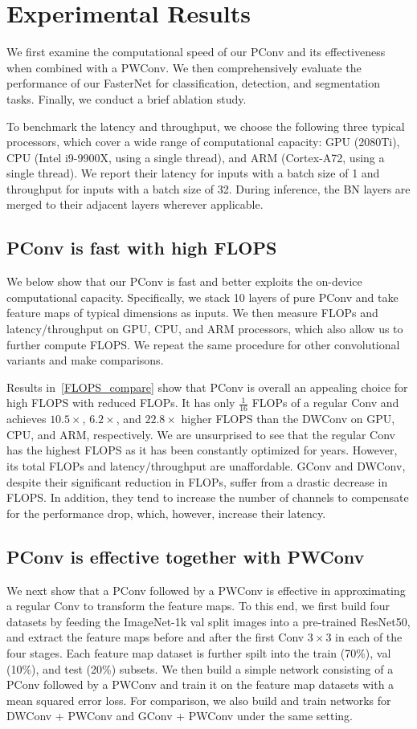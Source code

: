 \section{Experimental Results}
\label{sec:experiments}
We first examine the computational speed of our PConv and its effectiveness when combined with a PWConv. We then comprehensively evaluate the performance of our FasterNet for classification, detection, and segmentation tasks. Finally, we conduct a brief ablation study. 

To benchmark the latency and throughput, we choose the following three typical processors, which cover a wide range of computational capacity: GPU (2080Ti), CPU (Intel i9-9900X, using a single thread), and ARM (Cortex-A72, using a single thread). We report their latency for inputs with a batch size of 1 and throughput for inputs with a batch size of 32. During inference, the BN layers are merged to their adjacent layers wherever applicable.

\subsection{PConv is fast with high FLOPS}

We below show that our PConv is fast and better exploits the on-device computational capacity. Specifically, we stack 10 layers of pure PConv and take feature maps of typical dimensions as inputs. We then measure FLOPs and latency/throughput on GPU, CPU, and ARM processors, which also allow us to further compute FLOPS. We repeat the same procedure for other convolutional variants and make comparisons. 

Results in~\cref{FLOPS_compare} show that PConv is overall an appealing choice for high FLOPS with reduced FLOPs. It has only $\frac{1}{16}$ FLOPs of a regular Conv and achieves $10.5\times$, $6.2\times$, and $22.8\times$ higher FLOPS than the DWConv on GPU, CPU, and ARM, respectively. We are unsurprised to see that the regular Conv has the highest FLOPS as it has been constantly optimized for years. However, its total FLOPs and latency/throughput are unaffordable. GConv and DWConv, despite their significant reduction in FLOPs, suffer from a drastic decrease in FLOPS. In addition, they tend to increase the number of channels to compensate for the performance drop, which, however, increase their latency.

\subsection{PConv is effective together with PWConv}
We next show that a PConv followed by a PWConv is effective in approximating a regular Conv to transform the feature maps. To this end, we first build four datasets by feeding the ImageNet-1k val split images into a pre-trained ResNet50, and extract the feature maps before and after the first Conv $3\times3$ in each of the four stages. Each feature map dataset is further spilt into the train (70\%), val (10\%), and test (20\%) subsets. We then build a simple network consisting of a PConv followed by a PWConv and train it on the feature map datasets with a mean squared error loss. For comparison, we also build and train networks for DWConv + PWConv and GConv + PWConv under the same setting.


